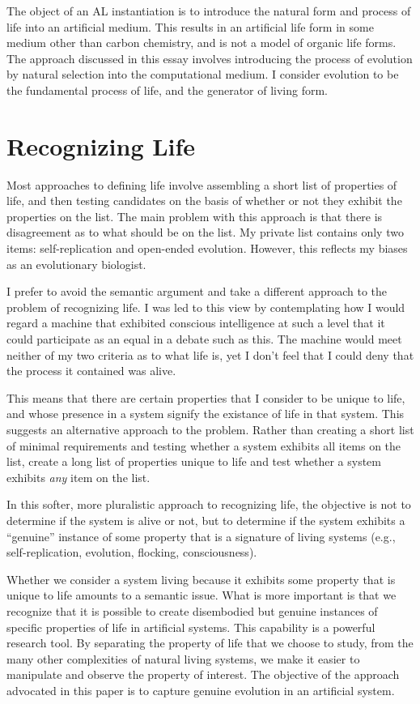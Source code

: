 The object of an AL instantiation is to introduce the natural form and
process of life into an artificial medium.  This results in an artificial
life form in some medium other than carbon chemistry, and is not a model
of organic life forms.  The approach discussed in this essay involves
introducing the process of evolution by natural selection into the
computational medium.  I consider evolution to be the fundamental
process of life, and the generator of living form.

\section{Recognizing Life}

Most approaches to defining life involve assembling a short list of
properties of life, and then testing candidates on the basis of
whether or not they exhibit the properties on the list.  The main
problem with this approach is that there is disagreement as to what
should be on the list.  My private list contains only two items:
self-replication and open-ended evolution.  However, this reflects
my biases as an evolutionary biologist.

I prefer to avoid the semantic argument and take a different approach
to the problem of recognizing life.  I was led to this view by
contemplating how I would regard a machine that exhibited conscious
intelligence at such a level that it could participate as an equal
in a debate such as this.  The machine would meet neither of my two
criteria as to what life is, yet I don't feel that I could deny that
the process it contained was alive.

This means that there are certain properties that I consider to be
unique to life, and whose presence in a system signify the existance
of life in that system.  This suggests an alternative approach to the
problem.  Rather than creating a short list of minimal requirements
and testing whether a system exhibits all items on the list, create a
long list of properties unique to life and test whether a system
exhibits {\em any} item on the list.

In this softer, more pluralistic approach to recognizing life, the
objective is not to determine if the system is alive or not, but to
determine if the system exhibits a ``genuine'' instance of some
property that is a signature of living systems (e.g., self-replication,
evolution, flocking, consciousness).

Whether we consider a system living because it exhibits some property that
is unique to life amounts to a semantic issue.  What is more important is
that we recognize that it is possible to create disembodied but genuine
instances of specific properties of life in artificial systems.  This
capability is a powerful research tool.  By separating the property of
life that we choose to study, from the many other complexities of natural
living systems, we make it easier to manipulate and observe the property
of interest.  The objective of the approach advocated in this paper is
to capture genuine evolution in an artificial system.

